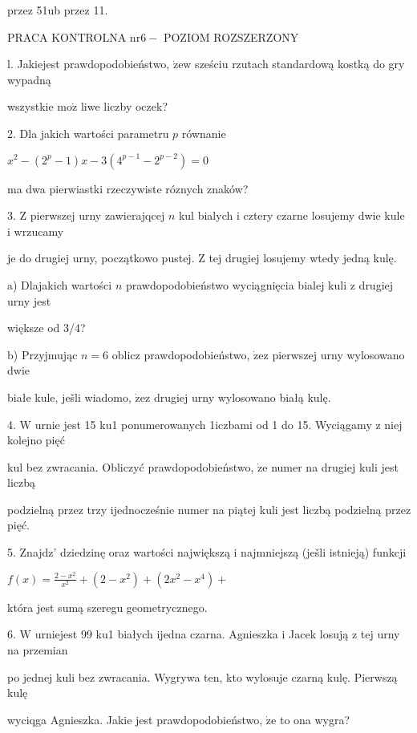 \documentclass[a4paper,12pt]{article}
\begin{document}
przez 51ub przez 11.




PRACA KONTROLNA $\mathrm{n}\mathrm{r} 6-$ POZIOM ROZSZERZONY

l. Jakiejest prawdopodobieństwo, $\dot{\mathrm{z}}\mathrm{e}\mathrm{w}$ sześciu rzutach standardową kostką do gry wypadną

wszystkie $\mathrm{m}\mathrm{o}\dot{\mathrm{z}}$ liwe liczby oczek?

2. Dla jakich wartości parametru $p$ równanie

$x^{2}-(2^{p}-1)x-3(4^{p-1}-2^{p-2})=0$

ma dwa pierwiastki rzeczywiste róznych znaków?

3. $\mathrm{Z}$ pierwszej urny zawierajqcej $n$ kul bialych $\mathrm{i}$ cztery czarne losujemy dwie kule $\mathrm{i}$ wrzucamy

je do drugiej urny, początkowo pustej. $\mathrm{Z}$ tej drugiej losujemy wtedy jedną kulę.

a) Dlajakich wartości $n$ prawdopodobieństwo wyciągnięcia bialej kuli $\mathrm{z}$ drugiej urny jest

większe od 3/4?

b) Przyjmując $n=6$ oblicz prawdopodobieństwo, $\dot{\mathrm{z}}\mathrm{e}\mathrm{z}$ pierwszej urny wylosowano dwie

białe kule, ješli wiadomo, $\dot{\mathrm{z}}\mathrm{e}\mathrm{z}$ drugiej urny wylosowano białą kulę.

4. $\mathrm{W}$ urnie jest 15 ku1 ponumerowanych 1iczbami od 1 do 15. Wyciągamy $\mathrm{z}$ niej kolejno pięć

kul bez zwracania. Obliczyć prawdopodobieństwo, $\dot{\mathrm{z}}\mathrm{e}$ numer na drugiej kuli jest liczbą

podzielną przez trzy ijednocześnie numer na piątej kuli jest liczbą podzielną przez pięć.

5. Znajdz' dziedzinę oraz wartości największą $\mathrm{i}$ najmniejszą (ješli istnieją) funkcji

$f(x)=\displaystyle \frac{2-x^{2}}{x^{2}}+(2-x^{2})+(2x^{2}-x^{4})+$

która jest sumą szeregu geometrycznego.

6. $\mathrm{W}$ urniejest 99 ku1 białych ijedna czarna. Agnieszka $\mathrm{i}$ Jacek losują $\mathrm{z}$ tej urny na przemian

po jednej kuli bez zwracania. Wygrywa ten, kto wylosuje czarną kulę. Pierwszą kulę

wyciqga Agnieszka. Jakie jest prawdopodobieństwo, $\dot{\mathrm{z}}\mathrm{e}$ to ona wygra?
\end{document}
